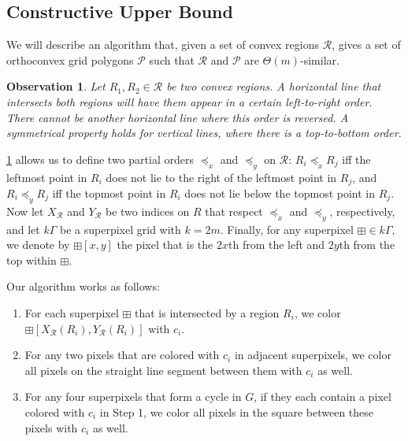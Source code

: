 \documentclass[a4paper,UKenglish,cleveref]{lipics-v2019}
\newtheorem{observation}{Observation}
\newcommand{\spix}{\boxplus}
\begin{document}

\subsection{Constructive Upper Bound}
\label{sub:convex_upper}
We will describe an algorithm that, given a set of convex regions \(\mathcal{R}\), gives a set of orthoconvex grid polygons \(\mathcal{P}\) such that \(\mathcal{R}\) and \(\mathcal{P}\) are \(\Theta(m)\)-similar.

\begin{observation}\label{obs:convex-ordering}
Let \(R_1,R_2 \in \mathcal{R}\) be two convex regions. A horizontal line that intersects both regions will have them appear in a certain left-to-right order. There cannot be another horizontal line where this order is reversed. A symmetrical property holds for vertical lines, where there is a top-to-bottom order.
\end{observation}

\cref{obs:convex-ordering} allows us to define two partial orders \(\preceq_x\) and \(\preceq_y\) on \(\mathcal{R}\): \(R_i \preceq_x R_j\) iff the leftmost point in \(R_i\) does not lie to the right of the leftmost point in \(R_j\), and \(R_i \preceq_y R_j\) iff the topmost point in \(R_i\) does not lie below the topmost point in \(R_j\). Now let \(X_\mathcal{R}\) and \(Y_\mathcal{R}\) be two indices on \(R\) that respect \(\preceq_x\) and \(\preceq_y\), respectively, and let \(k\Gamma\) be a superpixel grid with \(k = 2m\). Finally, for any superpixel \(\spix \in k\Gamma\), we denote by \(\spix[x, y]\) the pixel that is the \(2x\)th from the left and \(2y\)th from the top within \(\spix\).

Our algorithm works as follows:

\begin{enumerate}
	\item For each superpixel \(\spix\) that is intersected by a region \(R_i\), we color \(\spix[X_\mathcal{R}(R_i), Y_\mathcal{R}(R_i)]\) with \(c_i\).
	\item For any two pixels that are colored with \(c_i\) in adjacent superpixels, we color all pixels on the straight line segment between them with \(c_i\) as well.
	\item For any four superpixels that form a cycle in \(G\), if they each contain a pixel colored with \(c_i\) in Step 1, we color all pixels in the square between these pixels with \(c_i\) as well.
\end{enumerate}
\end{document}
